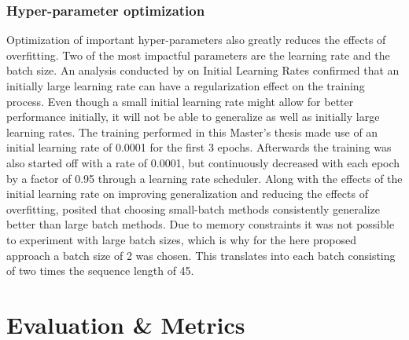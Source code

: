 \subsubsection{Hyper-parameter optimization} \label{sec:HyperParameterOptimization}
Optimization of important hyper-parameters also greatly reduces the effects of overfitting. Two of the most impactful parameters are the learning rate and the batch size.
\newline\newline
An analysis conducted by \citet{Yuanzhi:2019:RegularizationInitialLargeLearningRate} on Initial Learning Rates confirmed that an initially large learning rate can have a regularization effect on the training process. Even though a small initial learning rate might allow for better performance initially, it will not be able to generalize as well as initially large learning rates. The training performed in this Master's thesis made use of an initial learning rate of 0.0001 for the first 3 epochs. Afterwards the training was also started off with a rate of 0.0001, but continuously decreased with each epoch by a factor of 0.95 through a learning rate scheduler.
\newline\newline
Along with the effects of the initial learning rate on improving generalization and reducing the effects of overfitting, \citet{Keskar:2016:LargeBatchTrainingGeneralization} posited that choosing small-batch methods consistently generalize better than large batch methods. Due to memory constraints it was not possible to experiment with large batch sizes, which is why for the here proposed approach a batch size of 2 was chosen. This translates into each batch consisting of two times the sequence length of 45.


\section{Evaluation \& Metrics}
